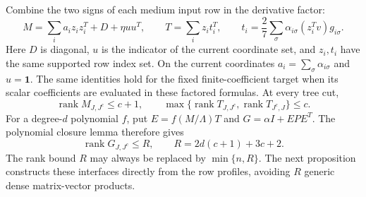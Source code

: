 \documentclass[11pt]{amsart}
\theoremstyle{definition}\newtheorem{definition}[theorem]{Definition}
\theoremstyle{remark}\newtheorem{remark}[theorem]{Remark}
\numberwithin{equation}{section}
\begin{document}
Combine the two signs of each medium input row in the derivative factor:
\[
 M=\sum_i a_i z_i z_i^T+D+\eta uu^T,
 \qquad T=\sum_i z_i t_i^T,
 \qquad
 t_i=\frac27\sum_{\sigma}\alpha_{i\sigma}(z_i^Tv)g_{i\sigma}.
\]
Here $D$ is diagonal, $u$ is the indicator of the current coordinate set,
and $z_i,t_i$ have the same supported row index set. On the current
coordinates $a_i=\sum_\sigma\alpha_{i\sigma}$ and $u=\mathbf1$.
The same identities hold for the fixed finite-coefficient target when its
scalar coefficients are evaluated in these factored formulas.
At every tree cut,
\[
 \operatorname{rank}M_{J,J^c}\le c+1,\qquad
 \max\{\operatorname{rank}T_{J,J^c},
        \operatorname{rank}T_{J^c,J}\}\le c.
\]
For a degree-$d$ polynomial $f$, put $E=f(M/\Lambda)T$ and
$G=\alpha I+EPE^T$. The polynomial closure lemma therefore gives
\begin{equation}\label{ifc:eq:supportR}
 \operatorname{rank}G_{J,J^c}\le R,
 \qquad R=2d(c+1)+3c+2.
\end{equation}
The rank bound $R$ may always be replaced by $\min\{n,R\}$.
The next proposition constructs these interfaces directly from the row
profiles, avoiding $R$ generic dense matrix-vector products.
\end{document}
